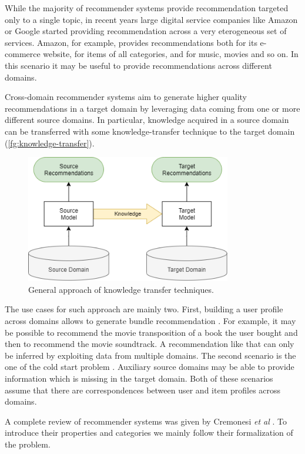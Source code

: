 While the majority of recommender systems provide recommendation targeted only to a single topic, in recent years large digital service companies like Amazon or Google started providing recommendation across a very eterogeneous set of services. Amazon, for example, provides recommendations both for its e-commerce website, for items of all categories, and for music, movies and so on. In this scenario it may be useful to provide recommendations across different domains.\par
Cross-domain recommender systems aim to generate higher quality recommendations in a target domain by leveraging data coming from one or more different source domains. In particular, knowledge acquired in a source domain can be transferred with some knowledge-transfer technique to the target domain (\autoref{fg:knowledge-transfer}).\\
\begin{figure}[hbt]
\centering
\includegraphics[width=0.8\textwidth]{pictures/knowledge-transfer}
\caption{General approach of knowledge transfer techniques.}
\label{fg:knowledge-transfer}
\end{figure}
The use cases for such approach are mainly two. First, building a user profile across domains allows to generate bundle recommendation \cite{10.1007/s11257-012-9131-2, 10.1007/s11257-007-9042-9, 10.1007/s11257-012-9128-x}. For example, it may be possible to recommend the movie transposition of a book the user bought and then to recommend the movie soundtrack. A recommendation like that can only be inferred by exploiting data from multiple domains. The second scenario is the one of the cold start problem \cite{10.1145/2645710.2645777, 10.1007/978-3-642-22362-4_26, 10.1145/2507157.2507206}. Auxiliary source domains may be able to provide information which is missing in the target domain. Both of these scenarios assume that there are correspondences between user and item profiles across domains.\par
A complete review of recommender systems was given by Cremonesi \textit{et al} \cite{10.1007/978-1-4899-7637-6_27}. To introduce their properties and categories we mainly follow their formalization of the problem.


